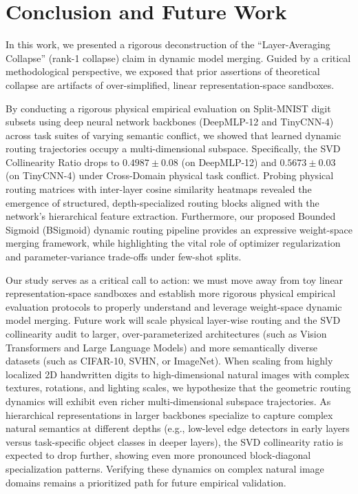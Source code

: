 \section{Conclusion and Future Work}
\label{sec:conclusion}

In this work, we presented a rigorous deconstruction of the ``Layer-Averaging Collapse'' (rank-1 collapse) claim in dynamic model merging. Guided by a critical methodological perspective, we exposed that prior assertions of theoretical collapse are artifacts of over-simplified, linear representation-space sandboxes. 

By conducting a rigorous physical empirical evaluation on Split-MNIST digit subsets using deep neural network backbones (DeepMLP-12 and TinyCNN-4) across task suites of varying semantic conflict, we showed that learned dynamic routing trajectories occupy a multi-dimensional subspace. Specifically, the SVD Collinearity Ratio drops to $0.4987 \pm 0.08$ (on DeepMLP-12) and $0.5673 \pm 0.03$ (on TinyCNN-4) under Cross-Domain physical task conflict. Probing physical routing matrices with inter-layer cosine similarity heatmaps revealed the emergence of structured, depth-specialized routing blocks aligned with the network's hierarchical feature extraction. Furthermore, our proposed Bounded Sigmoid (BSigmoid) dynamic routing pipeline provides an expressive weight-space merging framework, while highlighting the vital role of optimizer regularization and parameter-variance trade-offs under few-shot splits.

Our study serves as a critical call to action: we must move away from toy linear representation-space sandboxes and establish more rigorous physical empirical evaluation protocols to properly understand and leverage weight-space dynamic model merging. Future work will scale physical layer-wise routing and the SVD collinearity audit to larger, over-parameterized architectures (such as Vision Transformers and Large Language Models) and more semantically diverse datasets (such as CIFAR-10, SVHN, or ImageNet). When scaling from highly localized 2D handwritten digits to high-dimensional natural images with complex textures, rotations, and lighting scales, we hypothesize that the geometric routing dynamics will exhibit even richer multi-dimensional subspace trajectories. As hierarchical representations in larger backbones specialize to capture complex natural semantics at different depths (e.g., low-level edge detectors in early layers versus task-specific object classes in deeper layers), the SVD collinearity ratio is expected to drop further, showing even more pronounced block-diagonal specialization patterns. Verifying these dynamics on complex natural image domains remains a prioritized path for future empirical validation.
